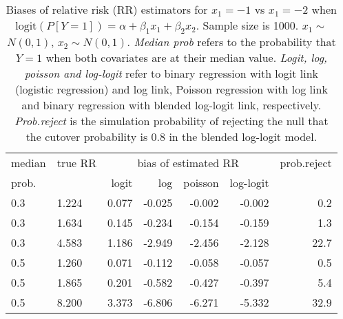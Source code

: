 \documentclass[12pt,a4paper]{article}
\begin{document}
\begin{table}[H] 
\small\sf\centering 
\caption{Biases of relative risk (RR) estimators for $x_1=-1$ vs $x_1=-2$ when $\mbox{logit}(P[Y=1])=\alpha+\beta_1 x_1 + \beta_2 x_2$. Sample size is 1000. $x_1 \sim $$N(0,1)$, $x_2 \sim N(0,1)$. {\it Median prob} refers to the probability that $Y=1$ when both covariates are at their median value. {\it Logit, log, poisson and log-logit} refer to binary regression with logit link (logistic regression) and log link, Poisson regression with log link and binary regression with blended log-logit link, respectively. {\it Prob.reject} is the simulation probability of rejecting the null that the cutover probability is $0.8$ in the blended log-logit model.} 
\begin{tabular}{llrrrrr} 
\toprule 
median & true RR & \multicolumn{4}{c}{bias of estimated RR} & prob.reject \\ 
prob. & & logit & log & poisson & log-logit  & \\ \midrule 
0.3 & 1.224 & 0.077 & -0.025 & -0.002 & -0.002 &  0.2 \\  
0.3 & 1.634 & 0.145 & -0.234 & -0.154 & -0.159 &  1.3 \\  
0.3 & 4.583 & 1.186 & -2.949 & -2.456 & -2.128 & 22.7 \\  
0.5 & 1.260 & 0.071 & -0.112 & -0.058 & -0.057 &  0.5 \\  
0.5 & 1.865 & 0.201 & -0.582 & -0.427 & -0.397 &  5.4 \\  
0.5 & 8.200 & 3.373 & -6.806 & -6.271 & -5.332 & 32.9 \\  
\bottomrule 
\end{tabular} 
\end{table} 
\end{document}
